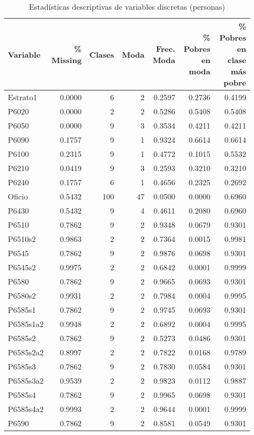 \begin{table}[H]
\centering
\caption{Estadísticas descriptivas de variables discretas (personas)}
\label{tab:descriptiva_personas_discreta}
\begin{tabular}{lrrrrrr}
\toprule
Variable & \% Missing & Clases & Moda & Frec. Moda & \% Pobres en moda & \% Pobres en clase más pobre \\
\midrule
Estrato1 & 0.0000 & 6 & 2 & 0.2597 & 0.2736 & 0.4199 \\
P6020 & 0.0000 & 2 & 2 & 0.5286 & 0.5408 & 0.5408 \\
P6050 & 0.0000 & 9 & 3 & 0.3534 & 0.4211 & 0.4211 \\
P6090 & 0.1757 & 9 & 1 & 0.9324 & 0.6614 & 0.6614 \\
P6100 & 0.2315 & 9 & 1 & 0.4772 & 0.1015 & 0.5532 \\
P6210 & 0.0419 & 9 & 3 & 0.2593 & 0.3210 & 0.3210 \\
P6240 & 0.1757 & 6 & 1 & 0.4656 & 0.2325 & 0.2692 \\
Oficio & 0.5432 & 100 & 47 & 0.0500 & 0.0000 & 0.6960 \\
P6430 & 0.5432 & 9 & 4 & 0.4611 & 0.2080 & 0.6960 \\
P6510 & 0.7862 & 9 & 2 & 0.9348 & 0.0679 & 0.9301 \\
P6510s2 & 0.9863 & 2 & 2 & 0.7364 & 0.0015 & 0.9981 \\
P6545 & 0.7862 & 9 & 2 & 0.9876 & 0.0698 & 0.9301 \\
P6545s2 & 0.9975 & 2 & 2 & 0.6842 & 0.0001 & 0.9999 \\
P6580 & 0.7862 & 9 & 2 & 0.9665 & 0.0693 & 0.9301 \\
P6580s2 & 0.9931 & 2 & 2 & 0.7984 & 0.0004 & 0.9995 \\
P6585s1 & 0.7862 & 9 & 2 & 0.9745 & 0.0693 & 0.9301 \\
P6585s1a2 & 0.9948 & 2 & 2 & 0.6892 & 0.0004 & 0.9995 \\
P6585s2 & 0.7862 & 9 & 2 & 0.5273 & 0.0486 & 0.9301 \\
P6585s2a2 & 0.8997 & 2 & 2 & 0.7822 & 0.0168 & 0.9789 \\
P6585s3 & 0.7862 & 9 & 2 & 0.7830 & 0.0584 & 0.9301 \\
P6585s3a2 & 0.9539 & 2 & 2 & 0.9823 & 0.0112 & 0.9887 \\
P6585s4 & 0.7862 & 9 & 2 & 0.9965 & 0.0698 & 0.9301 \\
P6585s4a2 & 0.9993 & 2 & 2 & 0.9644 & 0.0001 & 0.9999 \\
P6590 & 0.7862 & 9 & 2 & 0.8581 & 0.0549 & 0.9301 \\

\end{tabular}
\end{table}
